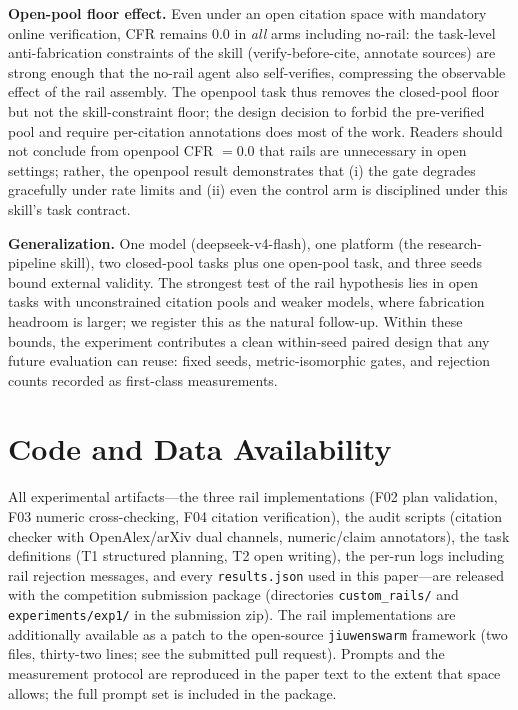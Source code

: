 \documentclass[10pt,twocolumn]{article}
\begin{document}
\textbf{Open-pool floor effect.} Even under an open citation space with mandatory online verification, CFR remains $0.0$ in \emph{all} arms including no-rail: the task-level anti-fabrication constraints of the skill (verify-before-cite, annotate sources) are strong enough that the no-rail agent also self-verifies, compressing the observable effect of the rail assembly. The openpool task thus removes the closed-pool floor but not the skill-constraint floor; the design decision to forbid the pre-verified pool and require per-citation annotations does most of the work. Readers should not conclude from openpool CFR $= 0.0$ that rails are unnecessary in open settings; rather, the openpool result demonstrates that (i) the gate degrades gracefully under rate limits and (ii) even the control arm is disciplined under this skill's task contract.

\textbf{Generalization.} One model (deepseek-v4-flash), one platform (the research-pipeline skill), two closed-pool tasks plus one open-pool task, and three seeds bound external validity. The strongest test of the rail hypothesis lies in open tasks with unconstrained citation pools and weaker models, where fabrication headroom is larger; we register this as the natural follow-up. Within these bounds, the experiment contributes a clean within-seed paired design that any future evaluation can reuse: fixed seeds, metric-isomorphic gates, and rejection counts recorded as first-class measurements.

\section*{Code and Data Availability}
All experimental artifacts---the three rail implementations (F02 plan validation, F03 numeric cross-checking, F04 citation verification), the audit scripts (citation checker with OpenAlex/arXiv dual channels, numeric/claim annotators), the task definitions (T1 structured planning, T2 open writing), the per-run logs including rail rejection messages, and every \texttt{results.json} used in this paper---are released with the competition submission package (directories \texttt{custom\_rails/} and \texttt{experiments/exp1/} in the submission zip). The rail implementations are additionally available as a patch to the open-source \texttt{jiuwenswarm} framework (two files, thirty-two lines; see the submitted pull request). Prompts and the measurement protocol are reproduced in the paper text to the extent that space allows; the full prompt set is included in the package.
\end{document}
